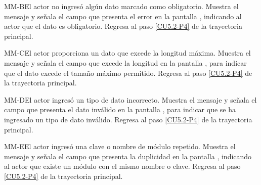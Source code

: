	\begin{UCtrayectoriaA}{MM-B}{El actor no ingresó algún dato marcado como obligatorio.}
		\UCpaso[\UCsist] Muestra el mensaje  y señala el campo que presenta el error en la pantalla , indicando al actor que el dato es obligatorio.
		\UCpaso Regresa al paso \ref{CU5.2-P4} de la trayectoria principal.
	\end{UCtrayectoriaA}
	
		\begin{UCtrayectoriaA}{MM-C}{El actor proporciona un dato que excede la longitud máxima.}
		\UCpaso[\UCsist] Muestra el mensaje  y señala el campo que excede la longitud en la pantalla , para indicar que el dato excede el tamaño máximo permitido.
		\UCpaso Regresa al paso \ref{CU5.2-P4} de la trayectoria principal.
	\end{UCtrayectoriaA}
	
	\begin{UCtrayectoriaA}{MM-D}{El actor ingresó un tipo de dato incorrecto.}
		\UCpaso[\UCsist] Muestra el mensaje  y señala el campo que presenta el dato inválido en la pantalla , para indicar que se ha ingresado un tipo de dato inválido.
		\UCpaso Regresa al paso \ref{CU5.2-P4} de la trayectoria principal.
	\end{UCtrayectoriaA}
	
	\begin{UCtrayectoriaA}{MM-E}{El actor ingresó una clave o nombre de módulo repetido.}
		\UCpaso[\UCsist] Muestra el mensaje  y señala el campo que presenta la duplicidad en la pantalla , indicando al actor que existe un módulo con el mismo nombre o clave.
		\UCpaso Regresa al paso \ref{CU5.2-P4} de la trayectoria principal.
	\end{UCtrayectoriaA}

